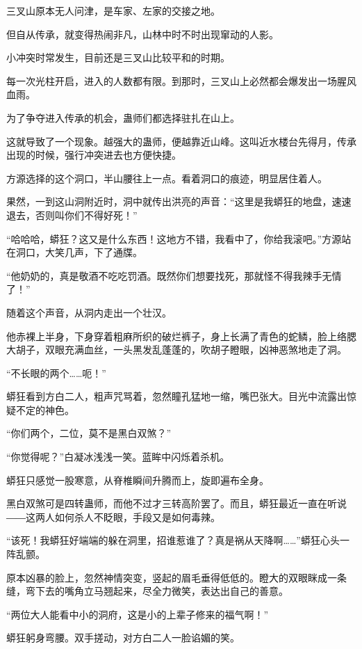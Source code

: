 
\begin{this_body}

三叉山原本无人问津，是车家、左家的交接之地。

但自从传承，就变得热闹非凡，山林中时不时出现窜动的人影。

小冲突时常发生，目前还是三叉山比较平和的时期。

每一次光柱开启，进入的人数都有限。到那时，三叉山上必然都会爆发出一场腥风血雨。

为了争夺进入传承的机会，蛊师们都选择驻扎在山上。

这就导致了一个现象。越强大的蛊师，便越靠近山峰。这叫近水楼台先得月，传承出现的时候，强行冲突进去也方便快捷。

方源选择的这个洞口，半山腰往上一点。看着洞口的痕迹，明显居住着人。

果然，一到这山洞附近时，洞中就传出洪亮的声音：“这里是我蟒狂的地盘，速速退去，否则叫你们不得好死！”

“哈哈哈，蟒狂？这又是什么东西！这地方不错，我看中了，你给我滚吧。”方源站在洞口，大笑几声，下了通牒。

“他奶奶的，真是敬酒不吃吃罚酒。既然你们想要找死，那就怪不得我辣手无情了！”

随着这个声音，从洞内走出一个壮汉。

他赤裸上半身，下身穿着粗麻所织的破烂裤子，身上长满了青色的蛇鳞，脸上络腮大胡子，双眼充满血丝，一头黑发乱蓬蓬的，吹胡子瞪眼，凶神恶煞地走了洞。

“不长眼的两个……呃！”

蟒狂看到方白二人，粗声咒骂着，忽然瞳孔猛地一缩，嘴巴张大。目光中流露出惊疑不定的神色。

“你们两个，二位，莫不是黑白双煞？”

“你觉得呢？”白凝冰浅浅一笑。蓝眸中闪烁着杀机。

蟒狂只感觉一股寒意，从脊椎瞬间升腾而上，旋即遍布全身。

黑白双煞可是四转蛊师，而他不过才三转高阶罢了。而且，蟒狂最近一直在听说――这两人如何杀人不眨眼，手段又是如何毒辣。

“该死！我蟒狂好端端的躲在洞里，招谁惹谁了？真是祸从天降啊……”蟒狂心头一阵乱颤。

原本凶暴的脸上，忽然神情突变，竖起的眉毛垂得低低的。瞪大的双眼眯成一条缝，弯下去的嘴角立马翘起来，尽全力微笑，表达出自己的善意。

“两位大人能看中小的洞府，这是小的上辈子修来的福气啊！”

蟒狂躬身弯腰。双手搓动，对方白二人一脸谄媚的笑。


\end{this_body}
